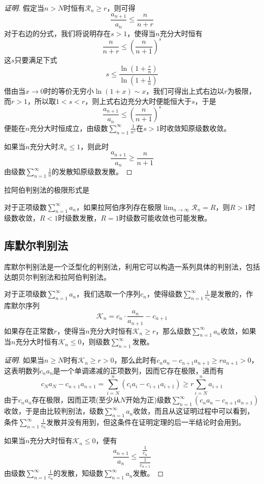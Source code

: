 \begin{proof}[证明]
  假定当$n>N$时恒有$\mathcal{R}_n \geqslant r$，则可得
  \[ \frac{a_{n+1}}{a_n} \leqslant \frac{n}{n+r} \]
  对于右边的分式，我们将说明存在$s>1$，使得当$n$充分大时恒有
  \[ \frac{n}{n+r} \leqslant \left( \frac{n}{n+1} \right)^s \]
  这$s$只要满足下式
  \[ s \leqslant \frac{\ln{\left( 1+\frac{r}{n} \right)}}{\ln{\left( 1+\frac{1}{n} \right)}} \]
  借由当$x \to 0$时的等价无穷小$\ln(1+x) \sim x$，我们可得出上式右边以$r$为极限，而$r>1$，所以取$1<s<r$，则上式右边充分大时便能恒大于$s$，于是
  \[ \frac{a_{n+1}}{a_n} \leqslant \left( \frac{n}{n+1} \right)^s \]
  便能在$n$充分大时恒成立，由级数$\sum_{n=1}^{\infty}\frac{1}{n^s}$在$s>1$时收敛知原级数收敛。

  如果当$n$充分大时$\mathcal{R}_n \leqslant 1$，则此时
  \[ \frac{a_{n+1}}{a_n} \geqslant \frac{n}{n+1} \]
  由级数$\sum_{n=1}^{\infty}\frac{1}{n}$的发散知原级数发散。
\end{proof}

拉阿伯判别法的极限形式是
\begin{inference}
  对于正项级数$\sum_{n=1}^{\infty}a_n$，如果拉阿伯序列存在极限$\lim_{n \to \infty} \mathcal{R}_n=R$，则$R>1$时级数收敛，$R<1$时级数发散，$R=1$时级数可能收敛也可能发散。
\end{inference}

\subsection{库默尔判别法}
\label{sec:kummer-method-about-series-converage}

库默尔判别法是一个泛型化的判别法，利用它可以构造一系列具体的判别法，包括达朗贝尔判别法和拉阿伯判别法。

\begin{theorem}
  对于正项级数$\sum_{n=1}^{\infty}a_n$，我们选取一个序列$c_n$，使得级数$\sum_{n=1}^{\infty}\frac{1}{c_n}$是发散的，作库默尔序列
  \[ \mathcal{K}_n = c_n \cdot \frac{a_n}{a_{n+1}} - c_{n+1} \]
  如果存在正常数$r$，使得当$n$充分大时恒有$\mathcal{K}_n \geqslant r$，那么级数$\sum_{n=1}^{\infty}a_n$收敛，如果当$n$充分大时恒有$\mathcal{K}_n \leqslant 0$，则级数$\sum_{n=1}^{\infty}$发散。
\end{theorem}

\begin{proof}[证明]
  如果当$n \geqslant N$时有$\mathcal{K}_n \geqslant r > 0$，那么此时有$c_na_n-c_{n+1}a_{n+1} \geqslant r a_{n+1} > 0$，这表明数列$c_na_n$是一个单调递减的正项数列，因而它存在极限，进而有
  \[ c_Na_N-c_{n+1}a_{n+1} = \sum_{i=N}^n (c_ia_i-c_{i+1}a_{i+1}) \geqslant r \sum_{i=N}^n a_{i+1} \]
  由于$c_na_n$存在极限，因而正项(至少从$N$开始为正)级数$\sum_{n=1}^{\infty}(c_na_n-c_{n+1}a_{n+1})$收敛，于是由比较判别法，级数$\sum_{n=1}^{\infty}a_n$收敛，而且从这证明过程中可以看到，条件$\sum_{n=1}^{\infty}\frac{1}{c_n}$发散并没有用到，但这条件在证明定理的后一半结论时会用到。

  如果当$n$充分大时恒有$\mathcal{K}_n \leqslant 0$，便有
  \[ \frac{a_{n+1}}{a_n} \leqslant \frac{\frac{1}{c_n}}{\frac{1}{c_{n+1}}} \]
  由级数$\sum_{n=1}^{\infty}\frac{1}{c_n}$的发散，知级数$\sum_{n=1}^{\infty}a_n$发散。
\end{proof}

